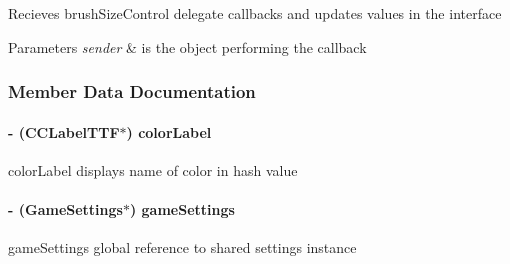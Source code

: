 Recieves brush\-Size\-Control delegate callbacks and updates values in the interface 
\begin{DoxyParams}{Parameters}
{\em sender} & is the object performing the callback \\
\hline
\end{DoxyParams}


\subsubsection{Member Data Documentation}
\hypertarget{interface_controls_layer_aa3d424dcbfa618632f97478ee61148cb}{
\paragraph[{color\-Label}]{\setlength{\rightskip}{0pt plus 5cm}-\/ (C\-C\-Label\-T\-T\-F$\ast$) color\-Label\hspace{0.3cm}{\ttfamily [protected]}}}\label{d1/d1a/interface_controls_layer_aa3d424dcbfa618632f97478ee61148cb}
color\-Label displays name of color in hash value \hypertarget{interface_controls_layer_a6fb04c60ed1bfab11e2940a025b4927e}{
\paragraph[{game\-Settings}]{\setlength{\rightskip}{0pt plus 5cm}-\/ ({\bf Game\-Settings}$\ast$) game\-Settings\hspace{0.3cm}{\ttfamily [protected]}}}\label{d1/d1a/interface_controls_layer_a6fb04c60ed1bfab11e2940a025b4927e}
game\-Settings global reference to shared settings instance 

